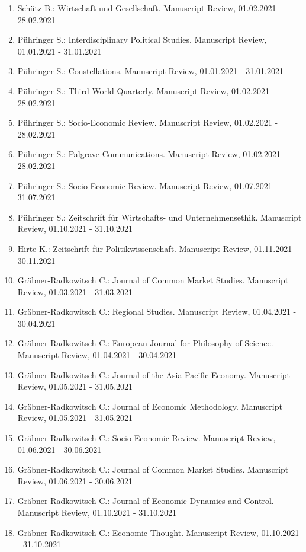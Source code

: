\begin{enumerate}[leftmargin=*, labelsep=0.5cm]
\item Schütz B.: Wirtschaft und Gesellschaft. Manuscript Review, 01.02.2021 - 28.02.2021
\item Pühringer S.: Interdisciplinary Political Studies. Manuscript Review, 01.01.2021 - 31.01.2021
\item Pühringer S.: Constellations. Manuscript Review, 01.01.2021 - 31.01.2021
\item Pühringer S.: Third World Quarterly. Manuscript Review, 01.02.2021 - 28.02.2021
\item Pühringer S.: Socio-Economic Review. Manuscript Review, 01.02.2021 - 28.02.2021
\item Pühringer S.: Palgrave Communications. Manuscript Review, 01.02.2021 - 28.02.2021
\item Pühringer S.: Socio-Economic Review. Manuscript Review, 01.07.2021 - 31.07.2021
\item Pühringer S.: Zeitschrift für Wirtschafts- und Unternehmensethik. Manuscript Review, 01.10.2021 - 31.10.2021
\item Hirte K.: Zeitschrift für Politikwissenschaft. Manuscript Review, 01.11.2021 - 30.11.2021
\item Gräbner-Radkowitsch C.: Journal of Common Market Studies. Manuscript Review, 01.03.2021 - 31.03.2021
\item Gräbner-Radkowitsch C.: Regional Studies. Manuscript Review, 01.04.2021 - 30.04.2021
\item Gräbner-Radkowitsch C.: European Journal for Philosophy of Science. Manuscript Review, 01.04.2021 - 30.04.2021
\item Gräbner-Radkowitsch C.: Journal of the Asia Pacific Economy. Manuscript Review, 01.05.2021 - 31.05.2021
\item Gräbner-Radkowitsch C.: Journal of Economic Methodology. Manuscript Review, 01.05.2021 - 31.05.2021
\item Gräbner-Radkowitsch C.: Socio-Economic Review. Manuscript Review, 01.06.2021 - 30.06.2021
\item Gräbner-Radkowitsch C.: Journal of Common Market Studies. Manuscript Review, 01.06.2021 - 30.06.2021
\item Gräbner-Radkowitsch C.: Journal of Economic Dynamics and Control. Manuscript Review, 01.10.2021 - 31.10.2021
\item Gräbner-Radkowitsch C.: Economic Thought. Manuscript Review, 01.10.2021 - 31.10.2021
\end{enumerate}
